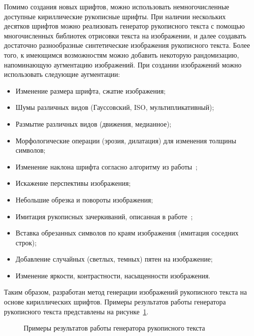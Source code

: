 Помимо создания новых шрифтов, можно использовать немногочисленные доступные кириллические рукописные шрифты.
При наличии нескольких десятков шрифтов можно реализовать генератор рукописного текста с помощью многочисленных библиотек
отрисовки текста на изображении, и далее создавать достаточно разнообразные синтетические изображения рукописного текста.
Более того, к имеющимся возможностям можно добавить некоторую рандомизацию, напоминающую аугментацию изображений.
При создании изображений можно использовать следующие аугментации:
\begin{itemize}
    \item Изменение размера шрифта, сжатие изображения;
    \item Шумы различных видов (Гауссовский, ISO, мультипликативный);
    \item Размытие различных видов (движения, медианное);
    \item Морфологические операции (эрозия, дилатация) для изменения толщины символов;
    \item Изменение наклона шрифта согласно алгоритму из работы~\cite{sueiras2021continuous};
    \item Искажение перспективы изображения;
    \item Небольшие обрезка и повороты изображения;
    \item Имитация рукописных зачеркиваний, описанная в работе~\cite{shonenkov2021stackmix};
    \item Вставка обрезанных символов по краям изображения (имитация соседних строк);
    \item Добавление случайных (светлых, темных) пятен на изображение;
    \item Изменение яркости, контрастности, насыщенности изображения.
\end{itemize}

Таким образом, разработан метод генерации изображений рукописного текста на основе кириллических шрифтов.
Примеры результатов работы генератора рукописного текста представлены на рисунке~\ref{fig:synthetic_example}.

\begin{figure}[h!]
    \centering
    \caption{Примеры результатов работы генератора рукописного текста}
    \label{fig:synthetic_example}
\end{figure}



